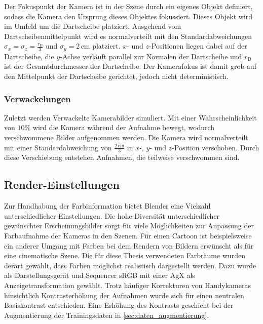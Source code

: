 Der Fokuspunkt der Kamera ist in der Szene durch ein eigenes Objekt definiert, sodass die Kamera den Ursprung dieses Objektes fokussiert. Dieses Objekt wird im Umfeld um die Dartscheibe platziert. Ausgehend vom Dartscheibenmittelpunkt wird es normalverteilt mit den Standardabweichungen $\sigma_x = \sigma_z = \frac{r_\text{D}}{3}$ und $\sigma_y = 2\,\text{cm}$ platziert. $x$- und $z$-Positionen liegen dabei auf der Dartscheibe, die $y$-Achse verläuft parallel zur Normalen der Dartscheibe und $r_\text{D}$ ist der Gesamtdurchmesser der Dartscheibe. Der Kamerafokus ist damit grob auf den Mittelpunkt der Dartscheibe gerichtet, jedoch nicht deterministisch.

\subsubsection{Verwackelungen}

Zuletzt werden Verwackelte Kamerabilder simuliert. Mit einer Wahrscheinlichkeit von $10\%$ wird die Kamera während der Aufnahme bewegt, wodurch verschwommene Bilder aufgenommen werden. Die Kamera wird normalverteilt mit einer Standardabweichung von $\frac{2\,\text{cm}}{3}$ in $x$-, $y$- und $z$-Position verschoben. Durch diese Verschiebung entstehen Aufnahmen, die teilweise verschwommen sind.

\subsection{Render-Einstellungen}  %
\label{sec:render_einstellungen}

Zur Handhabung der Farbinformation bietet Blender eine Vielzahl unterschiedlicher Einstellungen. Die hohe Diversität unterschiedlicher gewünschter Erscheinungsbilder sorgt für viele Möglichkeiten zur Anpassung der Farbaufnahme der Kameras in den Szenen. Für einen Cartoon ist beispielsweise ein anderer Umgang mit Farben bei dem Rendern von Bildern erwünscht als für eine cinematische Szene. Die für diese Thesis verwendeten Farbräume wurden derart gewählt, dass Farben möglichst realistisch dargestellt werden. Dazu wurde als Darstellungsgerät und Sequencer sRGB mit einer AgX als Anzeigetransformation gewählt. Trotz häufiger Korrekturen von Handykameras hinsichtlich Kontrasterhöhung der Aufnahmen wurde sich für einen neutralen Basiskontrast entschieden. Eine Erhöhung des Kontrasts geschieht bei der Augmentierung der Trainingsdaten in \autoref{sec:daten_augmentierung}.

